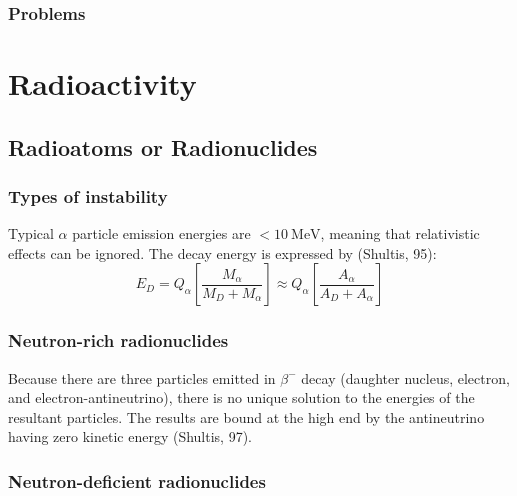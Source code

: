 \documentclass{article}
\begin{document}
\subsubsection{Problems}

\newpage

\section{Radioactivity}

\subsection{Radioatoms or Radionuclides}

\subsubsection{Types of instability}
Typical $\alpha$ particle emission energies are $<\SI{10}{\mega\electronvolt}$, meaning that relativistic effects can be ignored. The decay energy is expressed by (Shultis, 95): $$ E_D = Q_\alpha \left[ \frac{M_\alpha}{M_D + M_\alpha} \right] \approx Q_\alpha \left[\frac{A_\alpha}{A_D + A_\alpha} \right] $$

\subsubsection{Neutron-rich radionuclides}
Because there are three particles emitted in $ \beta^- $ decay (daughter nucleus, electron, and electron-antineutrino), there is no unique solution to the energies of the resultant particles. The results are bound at the high end by the antineutrino having zero kinetic energy (Shultis, 97).

\newpage

\subsubsection{Neutron-deficient radionuclides}
\end{document}
